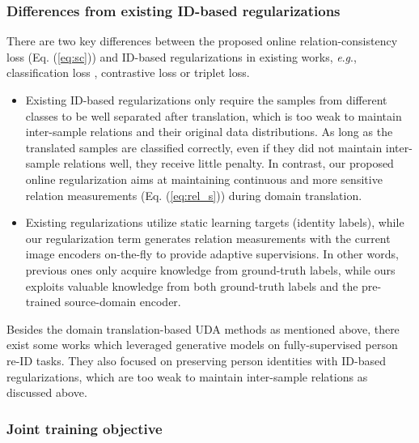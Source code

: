 \documentclass[journal]{IEEEtran}
\newcommand{\eg}{\textit{e}.\textit{g}., }
\begin{document}
\subsubsection{\textbf{Differences from existing ID-based regularizations}}
There are two key differences between the proposed online relation-consistency loss (Eq. (\ref{eq:sc})) and ID-based regularizations in existing works, \eg classification loss \cite{deng2018similarity,chen2019instance,zou2020joint}, contrastive loss \cite{deng2018image} or triplet loss.
\begin{itemize}
\item Existing ID-based regularizations only require the samples from different classes to be well separated after translation, which is too weak to maintain inter-sample relations and their original data distributions. As long as the translated samples are classified correctly, even if they did not maintain inter-sample relations well, they receive little penalty. In contrast, our proposed online regularization aims at maintaining continuous and more sensitive relation measurements (Eq. (\ref{eq:rel_s})) during domain translation.
\item Existing regularizations utilize static learning targets (identity labels), while our regularization term generates relation measurements with the current image encoders on-the-fly to provide adaptive supervisions.
In other words, previous ones only acquire knowledge from ground-truth labels, while ours exploits valuable knowledge from both ground-truth labels and the pre-trained source-domain encoder.
\end{itemize}

Besides the domain translation-based UDA methods as mentioned above, there exist some works \cite{liu2018pose,ge2018fd,zheng2019joint} which leveraged generative models on fully-supervised person re-ID tasks. They also focused on preserving person identities with ID-based regularizations, which are too weak to maintain inter-sample relations as discussed above.


\subsubsection{\textbf{Joint training objective}}
\end{document}
